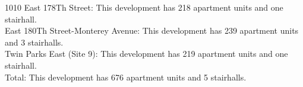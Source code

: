 {1010 East 178Th Street}: This development has 218 apartment units and one stairhall.\\{East 180Th Street-Monterey Avenue}: This development has 239 apartment units and 3 stairhalls.\\{Twin Parks East (Site 9)}: This development has 219 apartment units and one stairhall.\\{Total}: This development has 676 apartment units and 5 stairhalls.\\